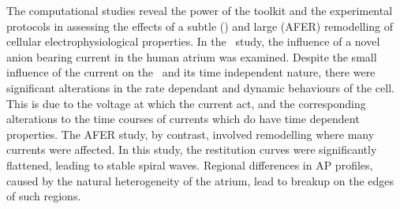 The computational studies reveal the power of the toolkit and the experimental
protocols in assessing the effects of a subtle () and large (AFER)
remodelling of cellular electrophysiological properties.
In the \ study, the influence of a novel anion bearing current in the
human atrium was examined.
Despite the small influence of the current on the \apd\ and its time independent
nature, there were significant alterations in the rate dependant and dynamic
behaviours of the cell.
This is due to the voltage at which the current act, and the corresponding
alterations to the time courses of currents which do have time dependent
properties.
The AFER study, by contrast, involved remodelling where many currents were
affected.
In this study, the restitution curves were significantly flattened, leading to
stable spiral waves.
Regional differences in AP profiles, caused by the natural heterogeneity of the
atrium, lead to breakup on the edges of such regions.
